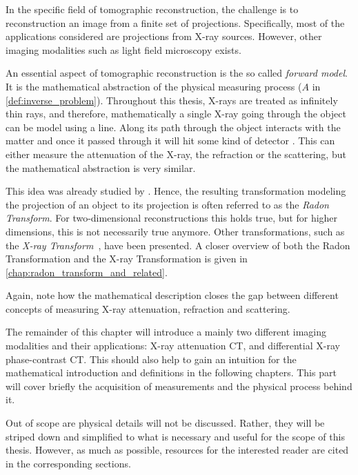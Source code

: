 In the specific field of tomographic reconstruction, the challenge is to reconstruction an image
from a finite set of projections. Specifically, most of the applications considered are projections
from X-ray sources. However, other imaging modalities such as light field microscopy exists.

An essential aspect of tomographic reconstruction is the so called \textit{forward model}. It is
the mathematical abstraction of the physical measuring process (\(A\) in
\autoref{def:inverse_problem}). Throughout this thesis, X-rays are treated as infinitely thin rays,
and therefore, mathematically a single X-ray going through the object can be model using a line.
Along its path through the object interacts with the matter and once it passed through it will hit
some kind of detector . This can either measure the
attenuation of the X-ray, the refraction or the scattering, but the mathematical abstraction is very
similar.

This idea was already studied by \citeauthor{radon_uber_1917}. Hence, the resulting transformation
modeling the projection of an object to its projection is often referred to as the \textit{Radon
	Transform}. For two-dimensional reconstructions this holds true, but for higher dimensions,
this is not necessarily true anymore. Other transformations, such as the \textit{X-ray
	Transform}~\cite{solmon_x-ray_1976}, have been presented. A closer overview of both the Radon
Transformation and the X-ray Transformation is given in \autoref{chap:radon_transform_and_related}.

Again, note how the mathematical description closes the gap between different concepts of
measuring X-ray attenuation, refraction and scattering.

The remainder of this chapter will introduce a mainly two different imaging modalities and their
applications: X-ray attenuation CT, and differential X-ray phase-contrast CT\@. This should
also help to gain an intuition for the mathematical introduction and definitions in the following
chapters. This part will cover briefly the acquisition of measurements and the physical process
behind it. 

Out of scope are physical details will not be discussed. Rather, they will be striped down and
simplified to what is necessary and useful for the scope of this thesis. However, as much as
possible, resources for the interested reader are cited in the corresponding sections.

